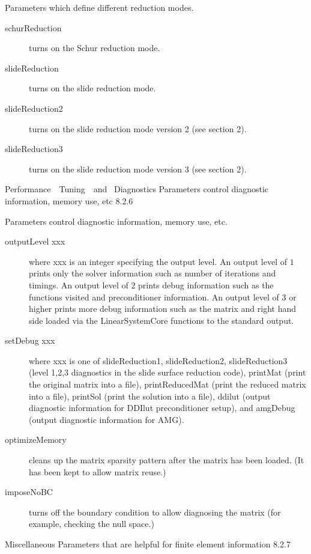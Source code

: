 \documentclass{article}
\begin{document}
\begin{cxxentry}
\begin{cxxentry}
\begin{cxxentry}
\begin{cxxdoc}
Parameters which define different reduction modes.

\begin{description}
\item[schurReduction] turns on the Schur reduction mode.
\item[slideReduction] turns on the slide reduction mode.
\item[slideReduction2] turns on the slide reduction mode version 2 
(see section 2).
\item[slideReduction3] turns on the slide reduction mode version 3 
(see section 2).
\end{description}
\end{cxxdoc}
\end{cxxentry}
\begin{cxxentry}
{Performance\ \ Tuning\ \ and\ }
        {Diagnostics}
        {}
        {
Parameters control diagnostic information, memory use, etc}
        {8.2.6}
\begin{cxxdoc}

Parameters control diagnostic information, memory use, etc.

\begin{description}
\item[outputLevel xxx] where xxx is an integer specifying the output
level.  An output level of $1$ prints only the solver 
information such as number of iterations and timings.
An output level of $2$ prints debug information such as
the functions visited and preconditioner information.
An output level of $3$ or higher prints more debug information 
such as the matrix and right hand side loaded via the 
LinearSystemCore functions to the standard output.
\item[setDebug xxx] where xxx is one of {\sf slideReduction1}, 
{\sf slideReduction2},
{\sf slideReduction3} (level 1,2,3 diagnostics in the slide surface
reduction code), {\sf printMat} (print the original matrix
into a file), {\sf printReducedMat} (print the reduced matrix
into a file),  {\sf printSol} (print the solution into a file), 
{\sf ddilut} (output diagnostic information for DDIlut
preconditioner setup), and {\sf amgDebug} (output diagnostic 
information for AMG).
\item[optimizeMemory] cleans up the matrix sparsity pattern after the matrix
has been loaded. (It has been kept to allow matrix reuse.)
\item[imposeNoBC] turns off the boundary condition to allow diagnosing the
matrix (for example, checking the null space.)
\end{description}
\end{cxxdoc}
\end{cxxentry}
\begin{cxxvariable}
{}
        {Miscellaneous}
        {}
        {
Parameters that are helpful for finite element information}
        {8.2.7}
\begin{cxxdoc}


\end{cxxdoc}
\end{cxxvariable}
\end{cxxentry}
\end{cxxentry}
\end{document}
